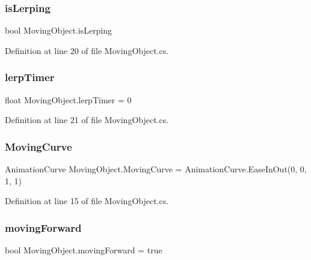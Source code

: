 \subsubsection{\texorpdfstring{is\+Lerping}{isLerping}}
{\footnotesize\ttfamily bool Moving\+Object.\+is\+Lerping\hspace{0.3cm}{\ttfamily [protected]}}



Definition at line 20 of file Moving\+Object.\+cs.

\mbox{\label{class_moving_object_aa38641f63fcfb4328378d7d34944b970}} 
\subsubsection{\texorpdfstring{lerp\+Timer}{lerpTimer}}
{\footnotesize\ttfamily float Moving\+Object.\+lerp\+Timer = 0\hspace{0.3cm}{\ttfamily [protected]}}



Definition at line 21 of file Moving\+Object.\+cs.

\mbox{\label{class_moving_object_a8c09cee080e7bc79f13f0efef14ff544}} 
\subsubsection{\texorpdfstring{Moving\+Curve}{MovingCurve}}
{\footnotesize\ttfamily Animation\+Curve Moving\+Object.\+Moving\+Curve = Animation\+Curve.\+Ease\+In\+Out(0, 0, 1, 1)}



Definition at line 15 of file Moving\+Object.\+cs.

\mbox{\label{class_moving_object_a9d2e223a1ea594a5fbec6e79387c1d3c}} 
\subsubsection{\texorpdfstring{moving\+Forward}{movingForward}}
{\footnotesize\ttfamily bool Moving\+Object.\+moving\+Forward = true\hspace{0.3cm}{\ttfamily [protected]}}



